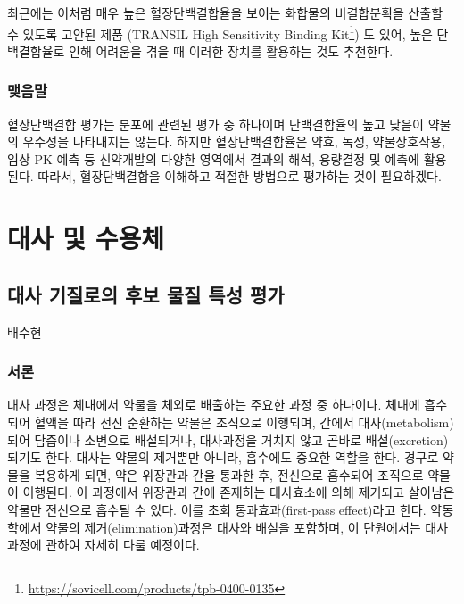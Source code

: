 \documentclass[
  11pt,
  krantz2, a4paper, twoside]{krantz}
\begin{document}
최근에는 이처럼 매우 높은 혈장단백결합율을 보이는 화합물의 비결합분획을 산출할 수 있도록 고안된 제품 (TRANSIL High Sensitivity Binding Kit\footnote{\url{https://sovicell.com/products/tpb-0400-0135}}) 도 있어, 높은 단백결합율로 인해 어려움을 겪을 때 이러한 장치를 활용하는 것도 추천한다.

\section{맺음말}\label{uxb9fauxc74cuxb9d0-2}

혈장단백결합 평가는 분포에 관련된 평가 중 하나이며 단백결합율의 높고 낮음이 약물의 우수성을 나타내지는 않는다. 하지만 혈장단백결합율은 약효, 독성, 약물상호작용, 임상 PK 예측 등 신약개발의 다양한 영역에서 결과의 해석, 용량결정 및 예측에 활용된다. 따라서, 혈장단백결합을 이해하고 적절한 방법으로 평가하는 것이 필요하겠다.

\part{대사 및 수용체}\label{part-uxb300uxc0ac-uxbc0f-uxc218uxc6a9uxccb4}

\chapter{대사 기질로의 후보 물질 특성 평가}\label{uxb300uxc0ac-uxae30uxc9c8uxb85cuxc758-uxd6c4uxbcf4-uxbb3cuxc9c8-uxd2b9uxc131-uxd3c9uxac00}

\Large\hfill

배수현
\normalsize

\section{서론}\label{uxc11cuxb860-3}

대사 과정은 체내에서 약물을 체외로 배출하는 주요한 과정 중 하나이다. 체내에 흡수되어 혈액을 따라 전신 순환하는 약물은 조직으로 이행되며, 간에서 대사(metabolism)되어 담즙이나 소변으로 배설되거나, 대사과정을 거치지 않고 곧바로 배설(excretion)되기도 한다. 대사는 약물의 제거뿐만 아니라, 흡수에도 중요한 역할을 한다. 경구로 약물을 복용하게 되면, 약은 위장관과 간을 통과한 후, 전신으로 흡수되어 조직으로 약물이 이행된다. 이 과정에서 위장관과 간에 존재하는 대사효소에 의해 제거되고 살아남은 약물만 전신으로 흡수될 수 있다. 이를 초회 통과효과(first-pass effect)라고 한다. 약동학에서 약물의 제거(elimination)과정은 대사와 배설을 포함하며, 이 단원에서는 대사 과정에 관하여 자세히 다룰 예정이다.
\end{document}
